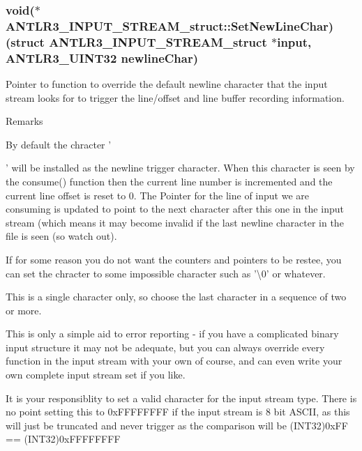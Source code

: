 \hypertarget{struct_a_n_t_l_r3___i_n_p_u_t___s_t_r_e_a_m__struct_a08d57c74e1b52ad004ea0f7fc93ae76b}{
\subsubsection[{Set\-New\-Line\-Char}]{\setlength{\rightskip}{0pt plus 5cm}void($\ast$ A\-N\-T\-L\-R3\-\_\-\-I\-N\-P\-U\-T\-\_\-\-S\-T\-R\-E\-A\-M\-\_\-struct\-::\-Set\-New\-Line\-Char)(struct {\bf A\-N\-T\-L\-R3\-\_\-\-I\-N\-P\-U\-T\-\_\-\-S\-T\-R\-E\-A\-M\-\_\-struct} $\ast$input, {\bf A\-N\-T\-L\-R3\-\_\-\-U\-I\-N\-T32} {\bf newline\-Char})}}\label{struct_a_n_t_l_r3___i_n_p_u_t___s_t_r_e_a_m__struct_a08d57c74e1b52ad004ea0f7fc93ae76b}
Pointer to function to override the default newline character that the input stream looks for to trigger the line/offset and line buffer recording information. \begin{DoxyRemark}{Remarks}

\begin{DoxyItemize}
\item By default the chracter '\par
' will be installed as the newline trigger character. When this character is seen by the consume() function then the current line number is incremented and the current line offset is reset to 0. The Pointer for the line of input we are consuming is updated to point to the next character after this one in the input stream (which means it may become invalid if the last newline character in the file is seen (so watch out).
\item If for some reason you do not want the counters and pointers to be restee, you can set the chracter to some impossible character such as '\textbackslash{}0' or whatever.
\item This is a single character only, so choose the last character in a sequence of two or more.
\item This is only a simple aid to error reporting -\/ if you have a complicated binary input structure it may not be adequate, but you can always override every function in the input stream with your own of course, and can even write your own complete input stream set if you like.
\item It is your responsiblity to set a valid character for the input stream type. There is no point setting this to 0x\-F\-F\-F\-F\-F\-F\-F\-F if the input stream is 8 bit A\-S\-C\-I\-I, as this will just be truncated and never trigger as the comparison will be (I\-N\-T32)0x\-F\-F == (I\-N\-T32)0x\-F\-F\-F\-F\-F\-F\-F\-F 
\end{DoxyItemize}
\end{DoxyRemark}


